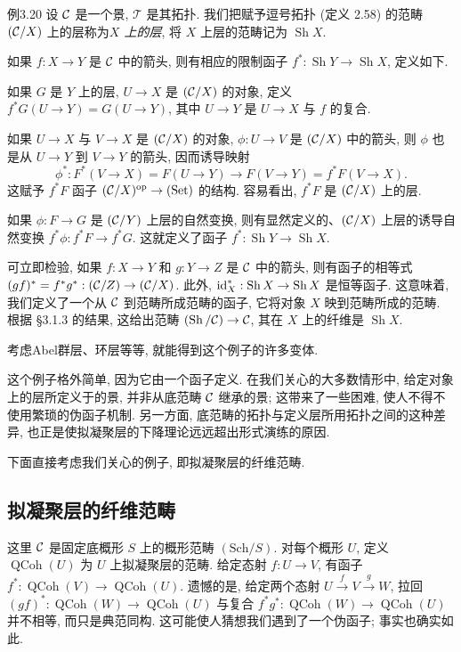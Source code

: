 \begin{origstatement}{例}{3.20}\label{ch03:ex320}
设 $\mathcal C$ 是一个景, $\mathcal T$ 是其拓扑. 我们把赋予逗号拓扑 (定义 2.58) 的范畴 $(\mathcal C/X)$ 上的层称为\emph{$X$ 上的层}, 将 $X$ 上层的范畴记为 $\operatorname{Sh}X$.

如果 $f:X\to Y$ 是 $\mathcal C$ 中的箭头, 则有相应的限制函子 $f^*:\operatorname{Sh}Y\to\operatorname{Sh}X$, 定义如下.

如果 $G$ 是 $Y$ 上的层, $U\to X$ 是 $(\mathcal C/X)$ 的对象, 定义 $f^*G(U\to Y)=G(U\to Y)$, 其中 $U\to Y$ 是 $U\to X$ 与 $f$ 的复合.

如果 $U\to X$ 与 $V\to X$ 是 $(\mathcal C/X)$ 的对象, $\phi:U\to V$ 是 $(\mathcal C/X)$ 中的箭头, 则 $\phi$ 也是从 $U\to Y$ 到 $V\to Y$ 的箭头, 因而诱导映射
\[
\phi^*:F^*(V\to X)=F(U\to Y)\longrightarrow F(V\to Y)=f^*F(V\to X).
\]
这赋予 $f^*F$ 函子 $(\mathcal C/X)^{\mathrm{op}}\to(\mathrm{Set})$ 的结构. 容易看出, $f^*F$ 是 $(\mathcal C/X)$ 上的层.

如果 $\phi:F\to G$ 是 $(\mathcal C/Y)$ 上层的自然变换, 则有显然定义的、$(\mathcal C/X)$ 上层的诱导自然变换 $f^*\phi:f^*F\to f^*G$. 这就定义了函子 $f^*:\operatorname{Sh}Y\to\operatorname{Sh}X$.

可立即检验, 如果 $f:X\to Y$ 和 $g:Y\to Z$ 是 $\mathcal C$ 中的箭头, 则有函子的相等式 $(gf)^*=f^*g^*:(\mathcal C/Z)\to(\mathcal C/X)$. 此外, $\mathrm{id}_X^*:\operatorname{Sh}X\to\operatorname{Sh}X$ 是恒等函子. 这意味着, 我们定义了一个从 $\mathcal C$ 到范畴所成范畴的函子, 它将对象 $X$ 映到范畴所成的范畴.
根据 \S3.1.3 的结果, 这给出范畴 $(\operatorname{Sh}/\mathcal C)\to\mathcal C$, 其在 $X$ 上的纤维是 $\operatorname{Sh}X$.
\end{origstatement}

考虑Abel群层、环层等等, 就能得到这个例子的许多变体.

这个例子格外简单, 因为它由一个函子定义. 在我们关心的大多数情形中, 给定对象上的层所定义于的景, 并非从底范畴 $\mathcal C$ 继承的景; 这带来了一些困难, 使人不得不使用繁琐的伪函子机制. 另一方面, 底范畴的拓扑与定义层所用拓扑之间的这种差异, 也正是使拟凝聚层的下降理论远远超出形式演练的原因.

下面直接考虑我们关心的例子, 即拟凝聚层的纤维范畴.

\subsection{拟凝聚层的纤维范畴}
\def\M{\mathcal M}\def\N{\mathcal N}\def\PP{\mathcal P}
\def\QCoh{\operatorname{QCoh}}
这里 $\mathcal C$ 是固定底概形 $S$ 上的概形范畴 $(\mathrm{Sch}/S)$. 对每个概形 $U$, 定义 $\QCoh(U)$ 为 $U$ 上拟凝聚层的范畴. 给定态射 $f:U\to V$, 有函子 $f^*:\QCoh(V)\to\QCoh(U)$. 遗憾的是, 给定两个态射 $U\xrightarrow f V\xrightarrow g W$, 拉回 $(gf)^*:\QCoh(W)\to\QCoh(U)$ 与复合 $f^*g^*:\QCoh(W)\to\QCoh(U)$ 并不相等, 而只是典范同构. 这可能使人猜想我们遇到了一个伪函子; 事实也确实如此.

